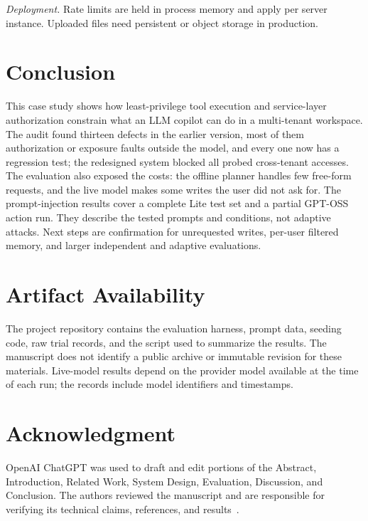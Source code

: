 \documentclass[conference]{IEEEtran}
\begin{document}
\textit{Deployment.} Rate limits are held in process memory and apply per server instance. Uploaded files need persistent or object storage in production.

\section{Conclusion}

This case study shows how least-privilege tool execution and service-layer authorization constrain what an LLM copilot can do in a multi-tenant workspace. The audit found thirteen defects in the earlier version, most of them authorization or exposure faults outside the model, and every one now has a regression test; the redesigned system blocked all probed cross-tenant accesses. The evaluation also exposed the costs: the offline planner handles few free-form requests, and the live model makes some writes the user did not ask for. The prompt-injection results cover a complete Lite test set and a partial GPT-OSS action run. They describe the tested prompts and conditions, not adaptive attacks. Next steps are confirmation for unrequested writes, per-user filtered memory, and larger independent and adaptive evaluations.

\section*{Artifact Availability}
The project repository contains the evaluation harness, prompt data, seeding code, raw trial records, and the script used to summarize the results. The manuscript does not identify a public archive or immutable revision for these materials. Live-model results depend on the provider model available at the time of each run; the records include model identifiers and timestamps.

\section*{Acknowledgment}
OpenAI ChatGPT was used to draft and edit portions of the Abstract, Introduction, Related Work, System Design, Evaluation, Discussion, and Conclusion. The authors reviewed the manuscript and are responsible for verifying its technical claims, references, and results~\cite{openai_chatgpt}.
\end{document}

